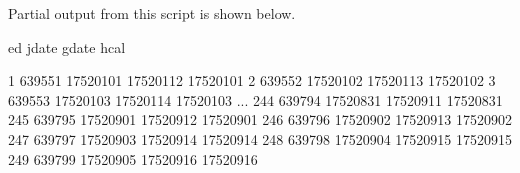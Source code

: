Partial output from this script is shown below.

\begin{code}
              ed        jdate        gdate         hcal

  1       639551     17520101     17520112     17520101
  2       639552     17520102     17520113     17520102
  3       639553     17520103     17520114     17520103
  ...
244       639794     17520831     17520911     17520831
245       639795     17520901     17520912     17520901
246       639796     17520902     17520913     17520902
247       639797     17520903     17520914     17520914
248       639798     17520904     17520915     17520915
249       639799     17520905     17520916     17520916
\end{code}